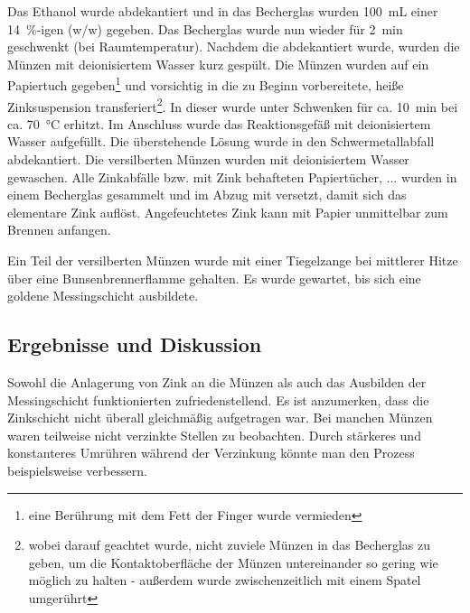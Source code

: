 \documentclass{article}
\begin{document}
        Das Ethanol wurde abdekantiert und in das Becherglas wurden \SI[mode=text]{100}{\milli\liter} einer \SI[mode=text]{14}{\percent}-igen (w/w)  gegeben. Das Becherglas wurde nun wieder für \SI[mode=text]{2}{\minute} geschwenkt (bei Raumtemperatur). Nachdem die  abdekantiert wurde, wurden die Münzen mit deionisiertem Wasser kurz gespült. Die Münzen wurden auf ein Papiertuch gegeben\footnote{eine Berührung mit dem Fett der Finger wurde vermieden} und vorsichtig in die zu Beginn vorbereitete, heiße Zinksuspension transferiert\footnote{wobei darauf geachtet wurde, nicht zuviele Münzen in das Becherglas zu geben, um die Kontaktoberfläche der Münzen untereinander so gering wie möglich zu halten - außerdem wurde zwischenzeitlich mit einem Spatel umgerührt}. In dieser wurde unter Schwenken für ca. \SI[mode=text]{10}{\minute} bei ca. \SI[mode=text]{70}{\degreeCelsius} erhitzt. Im Anschluss wurde das Reaktionsgefäß mit deionisiertem Wasser aufgefüllt. Die überstehende Lösung wurde in den Schwermetallabfall abdekantiert. Die versilberten Münzen wurden mit deionisiertem Wasser gewaschen. Alle Zinkabfälle bzw. mit Zink behafteten Papiertücher, ... wurden in einem Becherglas gesammelt und im Abzug mit  versetzt, damit sich das elementare Zink auflöst. Angefeuchtetes Zink kann mit Papier unmittelbar zum Brennen anfangen.
        
        Ein Teil der versilberten Münzen wurde mit einer Tiegelzange bei mittlerer Hitze über eine Bunsenbrennerflamme gehalten. Es wurde gewartet, bis sich eine goldene Messingschicht ausbildete.
      
    \subsection{Ergebnisse und Diskussion}
      
      Sowohl die Anlagerung von Zink an die Münzen als auch das Ausbilden der Messingschicht funktionierten zufriedenstellend. Es ist anzumerken, dass die Zinkschicht nicht überall gleichmäßig aufgetragen war. Bei manchen Münzen waren teilweise nicht verzinkte Stellen zu beobachten. Durch stärkeres und konstanteres Umrühren während der Verzinkung könnte man den Prozess beispielsweise verbessern. 
    
  \pagebreak
  
  \listofreactions
  \printbibliography[title=Literaturverzeichnis]
  \listoffigures
  \listoftables
  
\end{document}
